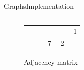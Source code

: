 \begin{frame}{Graphs}{Implementation}
\begin{columns}
\begin{column}{0.45\linewidth}
\begin{figure}[!h]
\begin{tabular}{p{0.25em}p{1.15em}p{1.15em}p{1.15em}p{1.15em}p{1.15em}}
          \cline{3-6}
          {} & {%
            \def\verticenumber{2}%
          } &
          \multicolumn{1}{|c|}{} & \multicolumn{1}{c}{} &
          \multicolumn{1}{|c|}{} & \multicolumn{1}{c|}{\color{MainB}-1}\\
          \cline{3-6}
          {} & {%
            \def\verticenumber{3}%
          } &
          \multicolumn{1}{|c|}{} & \multicolumn{1}{c}{\color{MainB}7} &
          \multicolumn{1}{|c|}{\color{MainB}-2} & \multicolumn{1}{c|}{}\\
          \cline{3-6}
        \end{tabular}
        \caption{Adjacency matrix}
      \end{figure}
    \end{column}
  \end{columns}
\end{frame}


